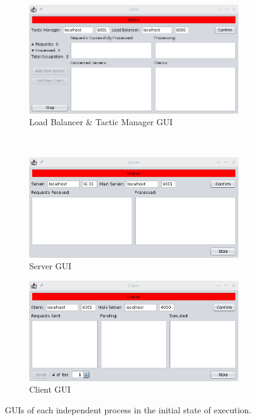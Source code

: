 \documentclass[12pt]{article}
\begin{document}
\begin{figure}[H] 
  \centering
  \begin{subfigure}{.55\textwidth}
    \centering
    \includegraphics[width=.95\linewidth]{img/LBM_init.png}
    \caption{Load Balancer \& Tactic Manager GUI}
    \label{fig:LBM_init}
  \end{subfigure} \\
  \begin{subfigure}{.5\textwidth}
    \centering
    \includegraphics[width=.95\linewidth]{img/S_init.png}
    \caption{Server GUI}
    \label{fig:S_init}
  \end{subfigure}%
  \begin{subfigure}{.5\textwidth}
    \centering
    \includegraphics[width=.95\linewidth]{img/C_init.png}
    \caption{Client GUI}
    \label{fig:C_init}
  \end{subfigure}
  \caption{GUIs of each independent process in the initial state of execution.}
  \label{fig:GUIs_init}
\end{figure} 
\end{document}
